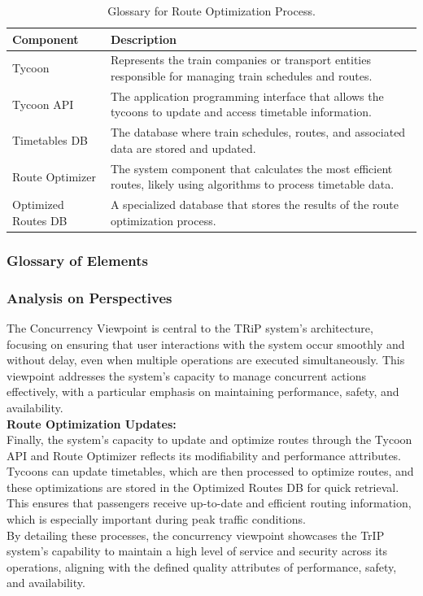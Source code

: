 \begin{table}[H]
    \centering
    \caption{Glossary for Route Optimization Process.}
    \label{tab:route_optimization_glossary}
    \begin{tabularx}{\textwidth}{@{}lX@{}} %
    \toprule
    \textbf{Component} & \textbf{Description} \\
    \midrule
    Tycoon & Represents the train companies or transport entities responsible for managing train schedules and routes. \\
    Tycoon API & The application programming interface that allows the tycoons to update and access timetable information. \\
    Timetables DB & The database where train schedules, routes, and associated data are stored and updated. \\
    Route Optimizer & The system component that calculates the most efficient routes, likely using algorithms to process timetable data. \\
    Optimized Routes DB & A specialized database that stores the results of the route optimization process. \\
    \bottomrule
    \end{tabularx}
\end{table}
\subsubsection{Glossary of Elements}

\subsubsection{Analysis on Perspectives}

The Concurrency Viewpoint is central to the TRiP system's architecture, focusing on ensuring that user interactions with the system occur smoothly and without delay, even when multiple operations are executed simultaneously. This viewpoint addresses the system's capacity to manage concurrent actions effectively, with a particular emphasis on maintaining performance, safety, and availability. \\

\noindent \textbf{Route Optimization Updates:} \\
Finally, the system’s capacity to update and optimize routes through the Tycoon API and Route Optimizer reflects its modifiability and performance attributes. Tycoons can update timetables, which are then processed to optimize routes, and these optimizations are stored in the Optimized Routes DB for quick retrieval. This ensures that passengers receive up-to-date and efficient routing information, which is especially important during peak traffic conditions. \\

By detailing these processes, the concurrency viewpoint showcases the TrIP system's capability to maintain a high level of service and security across its operations, aligning with the defined quality attributes of performance, safety, and availability.